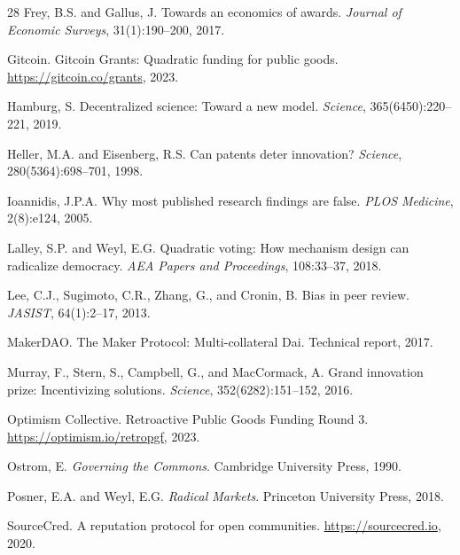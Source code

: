 \begin{thebibliography}{28}
Frey, B.S. and Gallus, J.
\newblock Towards an economics of awards.
\newblock \emph{Journal of Economic Surveys}, 31(1):190--200, 2017.

Gitcoin.
\newblock Gitcoin Grants: Quadratic funding for public goods.
\newblock \url{https://gitcoin.co/grants}, 2023.

Hamburg, S.
\newblock Decentralized science: Toward a new model.
\newblock \emph{Science}, 365(6450):220--221, 2019.

Heller, M.A. and Eisenberg, R.S.
\newblock Can patents deter innovation?
\newblock \emph{Science}, 280(5364):698--701, 1998.

Ioannidis, J.P.A.
\newblock Why most published research findings are false.
\newblock \emph{PLOS Medicine}, 2(8):e124, 2005.

Lalley, S.P. and Weyl, E.G.
\newblock Quadratic voting: How mechanism design can radicalize democracy.
\newblock \emph{AEA Papers and Proceedings}, 108:33--37, 2018.

Lee, C.J., Sugimoto, C.R., Zhang, G., and Cronin, B.
\newblock Bias in peer review.
\newblock \emph{JASIST}, 64(1):2--17, 2013.

MakerDAO.
\newblock The Maker Protocol: Multi-collateral Dai.
\newblock Technical report, 2017.

Murray, F., Stern, S., Campbell, G., and MacCormack, A.
\newblock Grand innovation prize: Incentivizing solutions.
\newblock \emph{Science}, 352(6282):151--152, 2016.

Optimism Collective.
\newblock Retroactive Public Goods Funding Round 3.
\newblock \url{https://optimism.io/retropgf}, 2023.

Ostrom, E.
\newblock \emph{Governing the Commons}.
\newblock Cambridge University Press, 1990.

Posner, E.A. and Weyl, E.G.
\newblock \emph{Radical Markets}.
\newblock Princeton University Press, 2018.

SourceCred.
\newblock A reputation protocol for open communities.
\newblock \url{https://sourcecred.io}, 2020.


\end{thebibliography}
